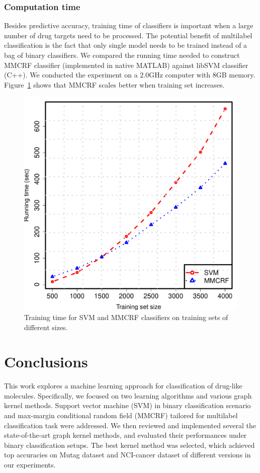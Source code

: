 \documentclass[english]{tktltiki}
\begin{document}
\subsubsection{Computation time}

Besides predictive accuracy, training time of classifiers is important when a large number of drug targets need to be processed. The potential benefit of multilabel classification is the fact that only single model
needs to be trained instead of a bag of binary classifiers. We compared the running time needed to construct MMCRF classifier (implemented in native MATLAB) against libSVM classifier (C++). We conducted the experiment on a \(2.0\)GHz computer with \(8\)GB memory. Figure~\ref{cpu_time} shows that MMCRF scales better when training set increases.

\begin{figure}[t]
\begin{center}
\centering
\includegraphics[width=0.6\columnwidth]{plots/cputime.pdf}
\caption[Training times from MMCRF against SVM.]{Training time for SVM and MMCRF classifiers on training sets of different sizes.}
\label{cpu_time}
\end{center}
\end{figure}



%
%
\clearpage
\section{Conclusions}

This work explores a machine learning approach for classification of drug-like molecules. Specifically, we focused on two learning algorithms and various graph kernel methods. Support vector machine (SVM) in binary classification scenario and max-margin conditional random field (MMCRF) tailored for multilabel classification task were addressed. We then reviewed and implemented several the state-of-the-art graph kernel methods, and evaluated their performances under binary classification setups. The best kernel method was selected, which achieved top accuracies on Mutag dataset and NCI-cancer dataset of different versions in our experiments.
\end{document}
